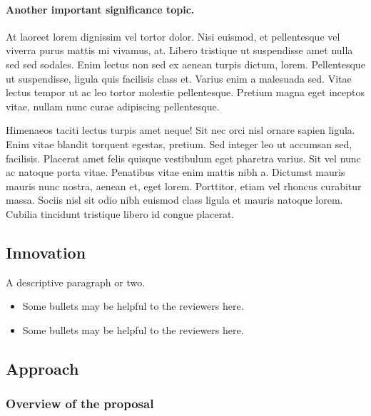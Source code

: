 \documentclass[11pt,]{article}
\providecommand{\tightlist}{%
  \setlength{\itemsep}{0pt}\setlength{\parskip}{0pt}}
\let\oldparagraph\paragraph
\renewcommand{\paragraph}[1]{\oldparagraph{#1}\mbox{}}
\begin{document}
\hypertarget{another-important-significance-topic.}{%
\paragraph{Another important significance
topic.}\label{another-important-significance-topic.}}

At laoreet lorem dignissim vel tortor dolor. Nisi euismod, et
pellentesque vel viverra purus mattis mi vivamus, at. Libero tristique
ut suspendisse amet nulla sed sed sodales. Enim lectus non sed ex aenean
turpis dictum, lorem. Pellentesque ut suspendisse, ligula quis facilisis
class et. Varius enim a malesuada sed. Vitae lectus tempor ut ac leo
tortor molestie pellentesque. Pretium magna eget inceptos vitae, nullam
nunc curae adipiscing pellentesque.

Himenaeos taciti lectus turpis amet neque! Sit nec orci nisl ornare
sapien ligula. Enim vitae blandit torquent egestas, pretium. Sed integer
leo ut accumsan sed, facilisis. Placerat amet felis quisque vestibulum
eget pharetra varius. Sit vel nunc ac natoque porta vitae. Penatibus
vitae enim mattis nibh a. Dictumst mauris mauris nunc nostra, aenean et,
eget lorem. Porttitor, etiam vel rhoncus curabitur massa. Sociis nisl
sit odio nibh euismod class ligula et mauris natoque lorem. Cubilia
tincidunt tristique libero id congue placerat.

\hypertarget{innovation}{%
\subsection{Innovation}\label{innovation}}

A descriptive paragraph or two.

\begin{itemize}
\tightlist
\item
  Some bullets may be helpful to the reviewers here.
\item
  Some bullets may be helpful to the reviewers here.
\end{itemize}

\hypertarget{approach}{%
\subsection{Approach}\label{approach}}

\hypertarget{overview-of-the-proposal}{%
\subsubsection{Overview of the
proposal}\label{overview-of-the-proposal}}
\end{document}
